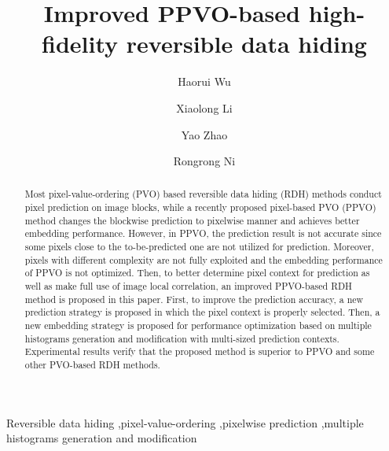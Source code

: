 \documentclass[review,3p,10pt,sort&compress]{elsarticle}
\begin{document}
\begin{frontmatter}

\title {Improved PPVO-based high-fidelity reversible data hiding}

\author{Haorui Wu}

\author{Xiaolong Li}

\author{Yao Zhao}

\author{Rongrong Ni}

\address[mymainaddress]{Institute of Information Science, Beijing Jiaotong University, Beijing 100044, China}
\address[mysecondaryaddress]{Beijing Key Laboratory of Advanced Information Science and Network Technology, Beijing 100044, China}

\begin{abstract}
Most pixel-value-ordering (PVO) based reversible data hiding (RDH) methods conduct pixel prediction on image blocks, while a recently proposed pixel-based PVO (PPVO) method changes the blockwise prediction to pixelwise manner and achieves better embedding performance. However, in PPVO, the prediction result is not accurate since some pixels close to the to-be-predicted one are not utilized for prediction. Moreover, pixels with different complexity are not fully exploited and the embedding performance of PPVO is not optimized. Then, to better determine pixel context for prediction as well as make full use of image local correlation, an improved PPVO-based RDH method is proposed in this paper. First, to improve the prediction accuracy, a new prediction strategy is proposed in which the pixel context is properly selected. Then, a new embedding strategy is proposed for performance optimization based on multiple histograms generation and modification with multi-sized prediction contexts. Experimental results verify that the proposed method is superior to PPVO and some other PVO-based RDH methods.

\end{abstract}


\begin{keyword}
   Reversible data hiding \sep pixel-value-ordering \sep pixelwise prediction \sep multiple histograms generation and modification
\end{keyword}

\end{frontmatter}
\end{document}

